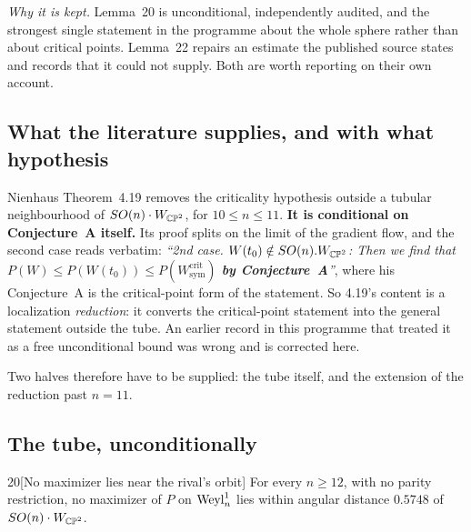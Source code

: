\emph{Why it is kept.} Lemma~20 is unconditional, independently audited, and the strongest single statement in the programme about the whole sphere rather than about critical points. Lemma~22 repairs an estimate the published source states and records that it could not supply. Both are worth reporting on their own account.

\subsection{What the literature supplies, and with what hypothesis}

Nienhaus \cite{nienhaus2023} Theorem~4.19 removes the criticality hypothesis outside a tubular neighbourhood of $SO(n)\cdot W_{\mathbb{CP}^2}$, for $10\le n\le11$. \textbf{It is conditional on Conjecture~A itself.} Its proof splits on the limit of the gradient flow, and the second case reads verbatim: \emph{``2nd case. $W(t_0)\notin SO(n).W_{\mathbb{CP}^2}$: Then we find that $P(W)\le P(W(t_0))\le P(W^{\mathrm{crit}}_{\mathrm{sym}})$ \textbf{by Conjecture~A}''}, where his Conjecture~A is the critical-point form of the statement. So 4.19's content is a localization \emph{reduction}: it converts the critical-point statement into the general statement outside the tube. An earlier record in this programme that treated it as a free unconditional bound was wrong and is corrected here.

Two halves therefore have to be supplied: the tube itself, and the extension of the reduction past $n=11$.

\subsection{The tube, unconditionally}

\begin{Lem}{20}[No maximizer lies near the rival's orbit]
For every $n\ge12$, with no parity restriction, no maximizer of $P$ on $\mathrm{Weyl}^1_n$ lies within angular distance $0.5748$ of $SO(n)\cdot W_{\mathbb{CP}^2}$.
\end{Lem}

